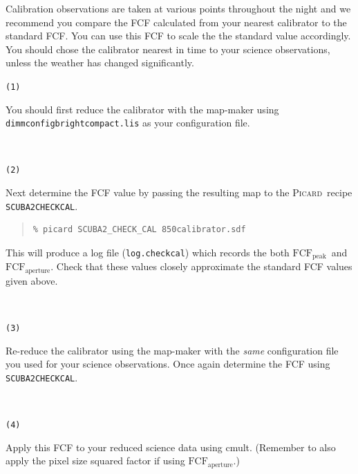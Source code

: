 \documentclass[twoside,11pt]{article}
\newcommand{\xref}[3]{#1}
\renewcommand{\_}{\texttt{\symbol{95}}}
\newenvironment{myquote}{\begin{quote}\begin{small}}{\end{small}\end{quote}}
\newcommand{\fcfb}{$\mathrm{FCF_{peak}}$}
\newcommand{\fcfa}{$\mathrm{FCF_{aperture}}$}
\newcommand{\picard}{\xref{\textsc{Picard}}{sun265}{}}
\newcommand{\drrecipe}[1]{\texttt{#1}}
\newcommand{\task}[1]{\textsf{#1}}
\newcommand{\cmult}{\xref{\task{cmult}}{sun95}{CMULT}}
\begin{document}
Calibration observations are taken at various points throughout the
night and we recommend you compare the FCF calculated from your
nearest calibrator to the standard FCF. You can use this FCF to scale
the the standard value accordingly. You should chose the calibrator
nearest in time to your science observations, unless the weather has
changed significantly.
\vspace{1mm}\\
\begin{minipage}[t]{0.05\linewidth}
\texttt{(1)}
\end{minipage}
\begin{minipage}[t]{0.95\linewidth}
 You should first reduce the calibrator with the map-maker using
 \texttt{dimmconfig\_bright\_compact.lis} as your configuration file.
\end{minipage}
\vspace{1mm}\\
\begin{minipage}[t]{0.05\linewidth}
\texttt{(2)}
\end{minipage}
\begin{minipage}[t]{0.95\linewidth}
Next determine the FCF value by passing the resulting map to the
\picard\ recipe \xref{\drrecipe{SCUBA2\_CHECK\_CAL}}{sun265}{SCUBA2_CHECK_CAL}.
\begin{myquote}
\begin{verbatim}
% picard SCUBA2_CHECK_CAL 850calibrator.sdf
\end{verbatim}
\end{myquote}
This will produce a log file (\texttt{log.checkcal}) which records the both
\fcfb\ and \fcfa. Check that these values closely approximate the
standard FCF values given above.
\end{minipage}
\vspace{1mm}\\
\begin{minipage}[t]{0.05\linewidth}
\texttt{(3)}
\end{minipage}
\begin{minipage}[t]{0.95\linewidth}
Re-reduce the calibrator using the map-maker with the \emph{same}
configuration file you used for your science observations. Once again
determine the FCF using \drrecipe{SCUBA2\_CHECK\_CAL}.
\end{minipage}
\vspace{1mm}\\
\begin{minipage}[t]{0.05\linewidth}
\texttt{(4)}
\end{minipage}
\begin{minipage}[t]{0.95\linewidth}
Apply this FCF to your reduced science data using \cmult. (Remember to
also apply the pixel size squared factor if using \fcfa.)
\end{minipage}
\end{document}

